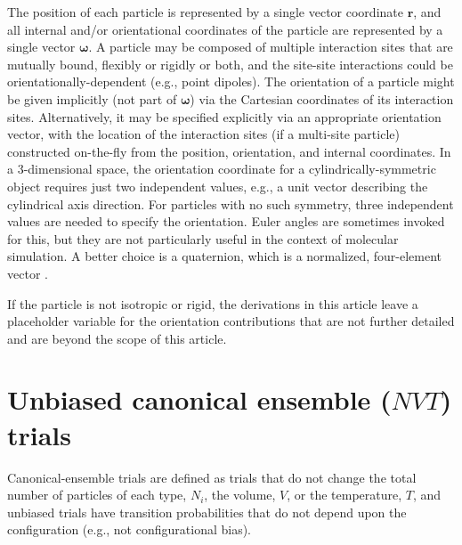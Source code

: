 \documentclass[
  9pt,
  bestpractices,
]{livecoms}
\begin{document}
The position of each particle is represented by a single vector coordinate $\mathbf{r}$, and all internal and/or orientational coordinates of the particle are represented by a single vector $\boldsymbol{\omega}$.
A particle may be composed of multiple interaction sites that are mutually bound, flexibly or rigidly or both, and the site-site interactions could be orientationally-dependent (e.g., point dipoles).
The orientation of a particle might be given implicitly (not part of $\boldsymbol{\omega}$) via the Cartesian coordinates of its interaction sites.
Alternatively, it may be specified explicitly via an appropriate orientation vector, with the location of the interaction sites (if a multi-site particle) constructed on-the-fly from the position, orientation, and internal coordinates.
In a 3-dimensional space, the orientation coordinate for a cylindrically-symmetric object requires just two independent values, e.g., a unit  vector describing the cylindrical axis direction.
For particles with no such symmetry, three independent values are needed to specify the orientation.
Euler angles are sometimes invoked for this, but they are not particularly useful in the context of molecular simulation.
A better choice is a quaternion, which is a normalized, four-element vector \cite{vesely_angular_1982, karney_quaternions_2007}.

If the particle is not isotropic or rigid, the derivations in this article leave a placeholder variable for the orientation contributions that are not further detailed and are beyond the scope of this article.

\section{\label{sec:rhs_nvt}Unbiased canonical ensemble ($NVT$) trials}

Canonical-ensemble trials are defined as trials that do not change the total number of particles of each type, $N_i$, the volume, $V$, or the temperature, $T$, and unbiased trials have transition probabilities that do not depend upon the configuration (e.g., not configurational bias).
\end{document}

